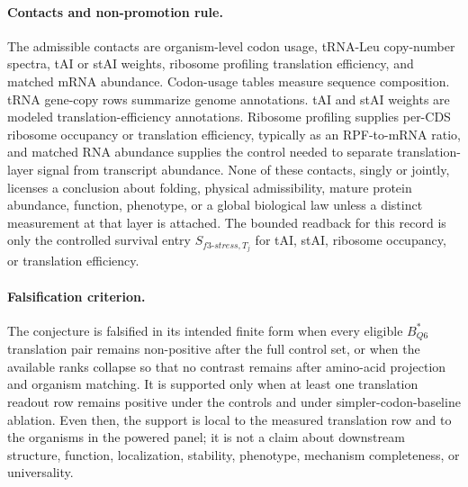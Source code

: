 \paragraph{Contacts and non-promotion rule.}
The admissible contacts are organism-level codon usage, tRNA-Leu copy-number spectra, tAI or stAI weights, ribosome profiling translation efficiency, and matched mRNA abundance. Codon-usage tables measure sequence composition. tRNA gene-copy rows summarize genome annotations. tAI and stAI weights are modeled translation-efficiency annotations. Ribosome profiling supplies per-CDS ribosome occupancy or translation efficiency, typically as an RPF-to-mRNA ratio, and matched RNA abundance supplies the control needed to separate translation-layer signal from transcript abundance. None of these contacts, singly or jointly, licenses a conclusion about folding, physical admissibility, mature protein abundance, function, phenotype, or a global biological law unless a distinct measurement at that layer is attached. The bounded readback for this record is only the controlled survival entry $S_{f3\text{-}stress,T_j}$ for tAI, stAI, ribosome occupancy, or translation efficiency.

\paragraph{Falsification criterion.}
The conjecture is falsified in its intended finite form when every eligible $B^{*}_{Q6}$ translation pair remains non-positive after the full control set, or when the available ranks collapse so that no contrast remains after amino-acid projection and organism matching. It is supported only when at least one translation readout row remains positive under the controls and under simpler-codon-baseline ablation. Even then, the support is local to the measured translation row and to the organisms in the powered panel; it is not a claim about downstream structure, function, localization, stability, phenotype, mechanism completeness, or universality.
